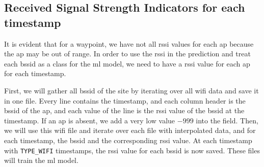 \subsection{Received Signal Strength Indicators for each timestamp}\label{sec:wifi-data}
It is evident that for a waypoint, we have not all \ac{rssi} values for each \ac{ap} because the \ac{ap} may be out of range.
In order to use the \ac{rssi} in the prediction and treat each \ac{bssid} as a class for the \ac{ml} model, we need to have a \ac{rssi} value for each \ac{ap} for each timestamp.

First, we will gather all \ac{bssid} of the site by iterating over all \ac{wifi} data and save it in one file.
Every line contains the timestamp, and each column header is the \ac{bssid} of the \ac{ap}, and each value of the line is the \ac{rssi} value of the \ac{bssid} at the timestamp.
If an \ac{ap} is absent, we add a very low value \(-999\) into the field. 
Then, we will use this \ac{wifi} file and iterate over each file with interpolated data, and for each timestamp, the \ac{bssid} and the corresponding \ac{rssi} value.
At each timestamp with \texttt{TYPE\_WIFI} timestamps, the \ac{rssi} value for each \ac{bssid} is now saved.
These files will train the \ac{ml} model.
